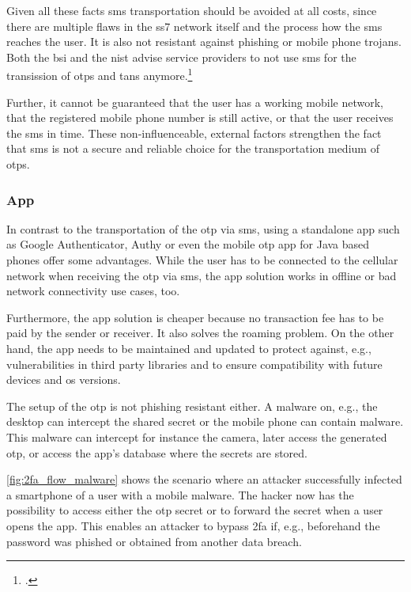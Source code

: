 Given all these facts \gls{sms} transportation should be avoided at all costs, since there are multiple flaws in the \gls{ss7} network itself and the process how the \gls{sms} reaches the user. It is also not resistant against phishing or mobile phone trojans. Both the \gls{bsi} and the \gls{nist} advise service providers to not use \gls{sms} for the transission of \glspl{otp} and \glspl{tan} anymore.\footcites[See][8]{JAKOBSSON20186}[See][27]{bsi2019recommendations2}[See][19]{SP80063B}

Further, it cannot be guaranteed that the user has a working mobile network, that the registered mobile phone number is still active, or that the user receives the \gls{sms} in time. These non-influenceable, external factors strengthen the fact that \gls{sms} is not a secure and reliable choice for the transportation medium of \glspl{otp}.

\subsubsection{App}
 
 In contrast to the transportation of the \gls{otp} via \gls{sms}, using a standalone app such as Google Authenticator, Authy or even the mobile \gls{otp} app for Java based phones offer some advantages. While the user has to be connected to the cellular network when receiving the \gls{otp} via \gls{sms}, the app solution works in offline or bad network connectivity use cases, too.
 
 Furthermore, the app solution is cheaper because no transaction fee has to be paid by the sender or receiver. It also solves the roaming problem. On the other hand, the app needs to be maintained and updated to protect against, e.g., vulnerabilities in third party libraries and to ensure compatibility with future devices and \gls{os} versions.
 
 The setup of the \gls{otp} is not phishing resistant either. A malware on, e.g., the desktop can intercept the shared secret or the mobile phone can contain malware. This malware can intercept for instance the camera, later access the generated \gls{otp}, or access the app's database where the secrets are stored.
 
 \autoref{fig:2fa_flow_malware} shows the scenario where an attacker successfully infected a smartphone of a user with a mobile malware. The hacker now has the possibility to access either the \gls{otp} secret or to forward the secret when a user opens the app. This enables an attacker to bypass \gls{2fa} if, e.g., beforehand the password was phished or obtained from another data breach.
 
